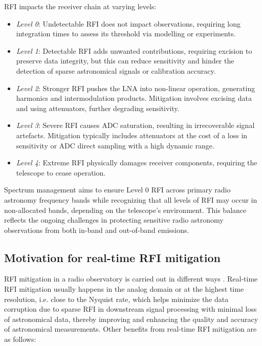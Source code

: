 RFI impacts the receiver chain at varying levels:
\begin{itemize}
\item \emph{Level 0}: Undetectable RFI does not impact observations, requiring long integration times to assess its threshold via modelling or experiments.
\item \emph{Level 1}: Detectable RFI adds unwanted contributions, requiring excision to preserve data integrity, but this can reduce sensitivity and hinder the detection of sparse astronomical signals or calibration accuracy.
\item \emph{Level 2}: Stronger RFI pushes the LNA into non-linear operation, generating harmonics and intermodulation products. Mitigation involves excising data and using attenuators, further degrading sensitivity.
\item \emph{Level 3}: Severe RFI causes ADC saturation, resulting in irrecoverable signal artefacts. Mitigation typically includes attenuators at the cost of a loss in sensitivity or ADC direct sampling with a high dynamic range.
\item \emph{Level 4}: Extreme RFI physically damages receiver components, requiring the telescope to cease operation.
\end{itemize}
Spectrum management aims to ensure Level 0 RFI across primary radio astronomy frequency bands while recognizing that all levels of RFI may occur in non-allocated bands, depending on the telescope's environment. This balance reflects the ongoing challenges in protecting sensitive radio astronomy observations from both in-band and out-of-band emissions.


\subsection{Motivation for real-time RFI mitigation}
\label{subsection:hardware:introduction: motivations}

RFI mitigation in a radio observatory is carried out in different ways \citep{ford2014rfi}. Real-time RFI mitigation usually happens in the analog domain or at the highest time resolution, i.e. close to the Nyquist rate, which helps minimize the data corruption due to sparse RFI in downstream signal processing with minimal loss of astronomical data, thereby improving and enhancing the quality and accuracy of astronomical measurements. Other benefits from real-time RFI mitigation are as follows:

